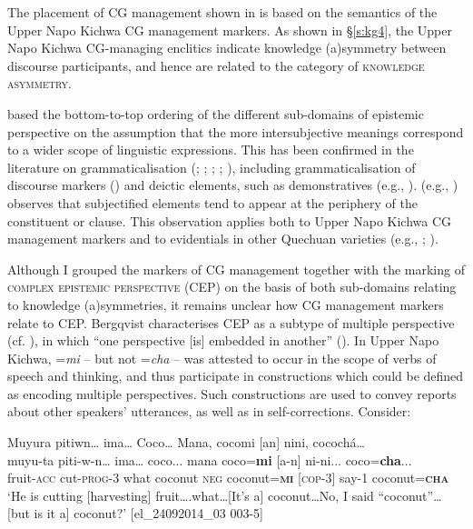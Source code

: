 \documentclass[output=paper]{langscibook}
\begin{document}
The placement of CG management shown in  is based on the semantics of the Upper Napo Kichwa CG management markers. As shown in §‎\ref{s:kg4}, the Upper Napo Kichwa CG-managing enclitics indicate knowledge (a)symmetry between discourse participants, and hence are related to the category of \textsc{knowledge asymmetry}.

\cite{Bergqvist2017} based the bottom-to-top ordering of the different sub-domains of epistemic perspective on the assumption that the more intersubjective meanings correspond to a wider scope of linguistic expressions. This has been confirmed in the literature on grammaticalisation (\citealt{Traugott1995}; \citeyear{Traugott2003}; \citeyear{Traugott2010}; \citeyear{Traugott2012}; \citealt{Traugott2002}), including grammaticalisation of discourse markers (\citealt{Traugott1995}) and deictic elements, such as demonstratives (e.g., \citealt{Kratochvil2011}). \citeauthor{Traugott2010} (e.g., \citeyear{Traugott2010}) observes that subjectified elements tend to appear at the periphery of the constituent or clause. This observation applies both to Upper Napo Kichwa CG management markers and to evidentials in other Quechuan varieties (e.g., \citealt{Muysken1995}; \citealt{Sanchez2015}).

Although I grouped the markers of CG management together with the marking of \textsc{complex epistemic perspective} (CEP) on the basis of both sub-domains relating to knowledge (a)symmetries, it remains unclear how CG management markers relate to CEP. Bergqvist characterises CEP as a subtype of multiple perspective (cf. \citealt{Evans2005}), in which “one perspective [is] embedded in another” (\citealt[6]{Bergqvist2017}). In Upper Napo Kichwa, =\textit{mi} – but not =\textit{cha} – was attested to occur in the scope of verbs of speech and thinking, and thus participate in constructions which could be defined as encoding multiple perspectives. Such constructions are used to convey reports about other speakers’ utterances, as well as in self-corrections. Consider:

\begin{exe}
	\ex \label{ex:kg22}
	\glll Muyura pitiwn… ima… Coco… Mana, cocomi [an] nini, cocochá…\\
	muyu-ta 	piti-w-n… ima… coco... mana coco=\textbf{mi} [a-n] ni-ni...   coco=\textbf{cha}...\\
	fruit-\textsc{acc} 	cut-\textsc{prog}-3 what coconut \textsc{neg} coconut=\textbf{\textsc{mi}} [\textsc{cop}-3] say-1 coconut=\textbf{\textsc{cha}}\\
	\trans ‘He is cutting [harvesting] fruit….what…[It’s a] coconut…No, I said “coconut”… [but is it a] coconut?’ [el\_24092014\_03   003-5]
\end{exe}
\end{document}
